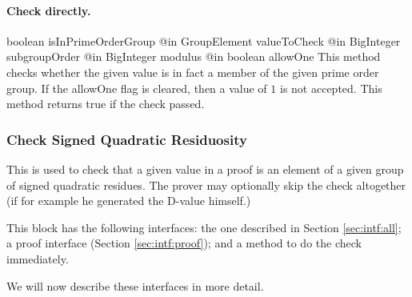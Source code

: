     \paragraph{Check directly.}
      \begin{method}
      {boolean}
      {isInPrimeOrderGroup}
      {
        {@in GroupElement valueToCheck}
        {@in BigInteger subgroupOrder}
        {@in BigInteger modulus}
        {@in boolean allowOne}
      }
      This method checks whether the given
      value is in fact a member of
      the given prime order group.
      If the allowOne flag is cleared, then a value of $1$ is not accepted.
      This method returns true if the check passed.
      \end{method}
    \subsubsection{Check Signed Quadratic Residuosity}

    This is used to check that a given value in a proof is
    an element of a given group of signed quadratic residues.
    The prover may optionally skip the check altogether (if for example he generated
    the D-value himself.)

    This block has the following interfaces:
    the one described in Section \ref{sec:intf:all};
    a proof interface (Section \ref{sec:intf:proof});
    and a method to do the check immediately.

      We will now describe these interfaces in more detail.

